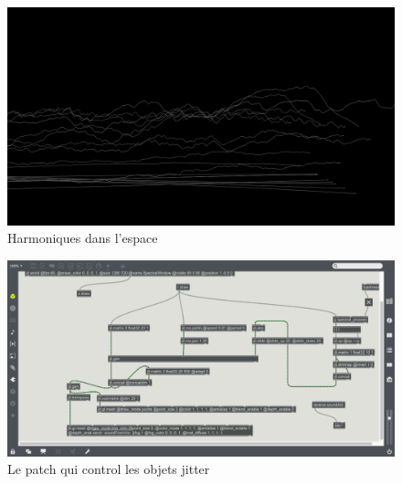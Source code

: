     \begin{figure}
        \centering
        \includegraphics[width = \textwidth ]{Graphs/SpectralWindow.png}
        \caption{Harmoniques dans l'espace}
        \label{SpectralWindow}
    \end{figure} 

    \begin{figure}
        \centering
        \includegraphics[width = \textwidth ]{Graphs/SpectralDraw.png}
        \caption{Le patch qui control les objets jitter}
        \label{SpectralDraw}
    \end{figure} 

